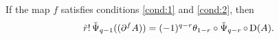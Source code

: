 %

\begin{lemma} If the map $f$ satisfies conditions \eqref{cond:1} and \eqref{cond:2}, then
\[
    \tilde{r}!\operatorname{\check{\Psi}}_{q-1}((\partial^{f} A)) = (-1)^{q-r}\theta_{1-r}\circ \operatorname{\check{\Psi}}_{q-r}\circ\operatorname{D}(A).
\]
\end{lemma}

